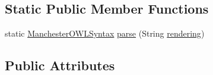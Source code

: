 \subsection*{Static Public Member Functions}
\begin{DoxyCompactItemize}
\item 
static \hyperlink{enumorg_1_1coode_1_1owlapi_1_1manchesterowlsyntax_1_1_manchester_o_w_l_syntax}{Manchester\-O\-W\-L\-Syntax} \hyperlink{enumorg_1_1coode_1_1owlapi_1_1manchesterowlsyntax_1_1_manchester_o_w_l_syntax_a6dd8e98b12220078e1e62c6721fe4fe3}{parse} (String \hyperlink{enumorg_1_1coode_1_1owlapi_1_1manchesterowlsyntax_1_1_manchester_o_w_l_syntax_af7eb5fe18cd56ce6d8d2dc97a6722bc3}{rendering})
\end{DoxyCompactItemize}
\subsection*{Public Attributes}
